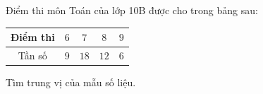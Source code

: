 \begin{ex}
Điểm thi môn Toán của lớp 10B được cho trong bảng sau:
\begin{center}
\begin{tabular}{|c|c|c|c|c|}\hline
Điểm thi & $6$ & $7$ & $8$ & $9$\\\hline
Tần số & $9$ & $18$ & $12$ & $6$\\\hline
\end{tabular}
\end{center}
Tìm trung vị của mẫu số liệu.
\end{ex}
